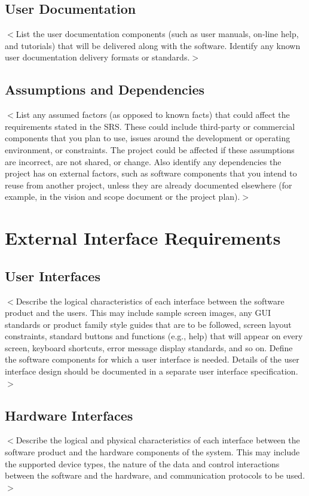 \documentclass{scrreprt}
\begin{document}
\section{User Documentation}
$<$List the user documentation components (such as user manuals, on-line help, 
and tutorials) that will be delivered along with the software. Identify any 
known user documentation delivery formats or standards.$>$

\section{Assumptions and Dependencies}
$<$List any assumed factors (as opposed to known facts) that could affect the 
requirements stated in the SRS. These could include third-party or commercial 
components that you plan to use, issues around the development or operating 
environment, or constraints. The project could be affected if these assumptions 
are incorrect, are not shared, or change. Also identify any dependencies the 
project has on external factors, such as software components that you intend to 
reuse from another project, unless they are already documented elsewhere (for 
example, in the vision and scope document or the project plan).$>$


\chapter{External Interface Requirements}

\section{User Interfaces}
$<$Describe the logical characteristics of each interface between the software 
product and the users. This may include sample screen images, any GUI standards 
or product family style guides that are to be followed, screen layout 
constraints, standard buttons and functions (e.g., help) that will appear on 
every screen, keyboard shortcuts, error message display standards, and so on.  
Define the software components for which a user interface is needed. Details of 
the user interface design should be documented in a separate user interface 
specification.$>$

\section{Hardware Interfaces}
$<$Describe the logical and physical characteristics of each interface between 
the software product and the hardware components of the system. This may include 
the supported device types, the nature of the data and control interactions 
between the software and the hardware, and communication protocols to be 
used.$>$
\end{document}
